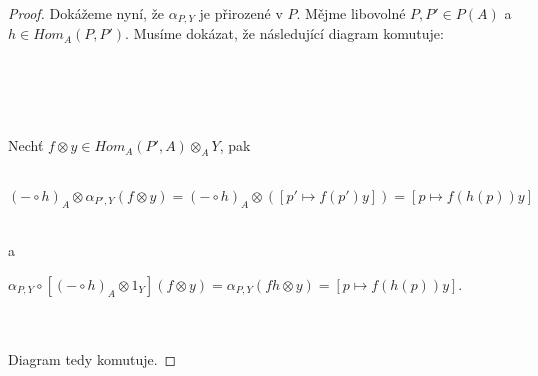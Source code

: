 \begin{proof}
        Dokážeme nyní, že $\alpha_{P,Y}$ je přirozené v $P$. Mějme libovolné $P,P'\in P(A)$ 
        a $h\in Hom_A(P,P')$. Musíme dokázat, že následující diagram komutuje:\\\\      
         \centerline{}\\\\\\
        Nechť $f \otimes y \in Hom_A(P', A)\otimes_A Y$, pak \\\\
        \centerline{$
          (-\circ h)_A\otimes \alpha_{P',Y}(f\otimes y)
          = (-\circ h)_A\otimes ([p' \mapsto f(p')y])
          = [p\mapsto f(h(p))y]
        $}\\
        a\\
        \centerline{$
          \alpha_{P,Y}\circ[(-\circ h)_A\otimes 1_Y](f\otimes y)
          = \alpha_{P,Y}(fh\otimes y)
          = [p\mapsto f(h(p))y]
        $.}\\\\
        Diagram tedy komutuje. 
        

\end{proof}
